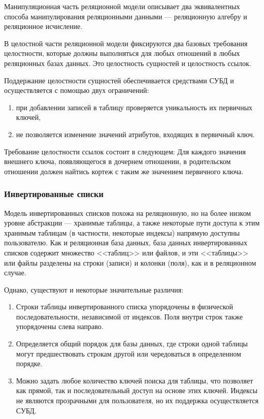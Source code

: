 Манипуляционная часть реляционной модели описывает два эквивалентных способа манипулирования реляционными данными --- реляционную алгебру и реляционное исчисление.~\cite{lecnotes}

В целостной части реляционной модели фиксируются два базовых требования целостности, которые должны выполняться для любых отношений в любых реляционных базах данных.
Это целостность сущностей и целостность ссылок.~\cite{lecnotes}

Поддержание целостности сущностей обеспечивается средствами СУБД и осуществляется с помощью двух ограничений:
\begin{enumerate}
    \item при добавлении записей в таблицу проверяется уникальность их первичных ключей,
    \item не позволяется изменение значений атрибутов, входящих в первичный ключ.~\cite{lecnotes}
\end{enumerate}

Требование целостности ссылок состоит в следующем:
Для каждого значения внешнего ключа, появляющегося в дочернем отношении, в родительском отношении должен найтись кортеж с таким же значением первичного ключа.~\cite{lecnotes}

\subsubsection{Инвертированные списки}

Модель инвертированных списков похожа на реляционную, но на более низком уровне абстракции --- хранимые таблицы, а также некоторые пути доступа к этим хранимым таблицам (в частности, некоторые индексы) напрямую доступны пользователю.
Как и реляционная база данных, база данных инвертированных списков содержит множество <<таблиц>> или файлов, и эти <<таблицы>> или файлы разделены на строки (записи) и колонки (поля), как и в реляционном случае.~\cite[с. 388]{date-wr}

Однако, существуют и некоторые значительные различия:
\begin{enumerate}
    \item Строки таблицы инвертированного списка упорядочены в физической последовательности, независимой от индексов.
        Поля внутри строк также упорядочены слева направо.
    \item Определяется общий порядок для базы данных, где строки одной таблицы могут предшествовать строкам другой или чередоваться в определенном порядке.
    \item Можно задать любое количество ключей поиска для таблицы, что позволяет как прямой, так и последовательный доступ на основе этих ключей.
        Индексы не являются прозрачными для пользователя, но их поддержка осуществляется СУБД.
\end{enumerate}

